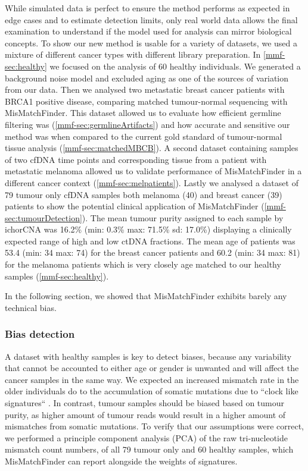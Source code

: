 While simulated data is perfect to ensure the method performs as expected in edge cases and to estimate detection limits, only real world data allows the final examination to understand if the model used for analysis can mirror biological concepts. To show our new method is usable for a variety of datasets, we used a mixture of different cancer types with different library preparation. In \autoref{mmf-sec:healthy} we focused on the analysis of 60  healthy individuals. We generated a background noise model and excluded aging as one of the sources of variation from our data. Then we analysed two metastatic breast cancer patients with BRCA1 positive disease, comparing matched tumour-normal sequencing with MisMatchFinder. This dataset allowed us to evaluate how efficient germline filtering was (\autoref{mmf-sec:germlineArtifacts}) and how accurate and sensitive our method was when compared to the current gold standard of tumour-normal tissue analysis (\autoref{mmf-sec:matchedMBCB}).
A second dataset containing samples of two cfDNA time points and corresponding tissue from a patient with metastatic melanoma allowed us to validate performance of MisMatchFinder in a different cancer context (\autoref{mmf-sec:melpatients}). Lastly we analysed a dataset of 79 tumour only cfDNA samples both melanoma (40) and breast cancer (39) patients to show the potential clinical application of MisMatchFinder (\autoref{mmf-sec:tumourDetection}). The mean tumour purity assigned to each sample by ichorCNA was 16.2\% (min: 0.3\% max: 71.5\% sd: 17.0\%) displaying a clinically expected range of high and low ctDNA fractions. The mean age of patients was 53.4 (min: 34 max: 74) for the breast cancer patients and 60.2 (min: 34 max: 81) for the melanoma patients which is very closely age matched to our healthy samples (\autoref{mmf-sec:healthy}).

In the following section, we showed that MisMatchFinder exhibits barely any technical bias.

\subsubsection{Bias detection}
\label{mmf-sec:healthyBias}
A dataset with healthy samples is key to detect biases, because any variability that cannot be accounted to either age or gender is unwanted and will affect the cancer samples in the same way. We expected an increased mismatch rate in the older individuals do to the accumulation of somatic mutations due to ``clock like signatures`` \cite{Abascal2021}. In contrast, tumour samples should be biased based on tumour purity, as higher amount of tumour reads would result in a higher amount of mismatches from somatic mutations.
To verify that our assumptions were correct, we performed a principle component analysis (PCA) of the raw tri-nucleotide mismatch count numbers, of all 79 tumour only and 60 healthy samples, which MisMatchFinder can report alongside the weights of signatures.

